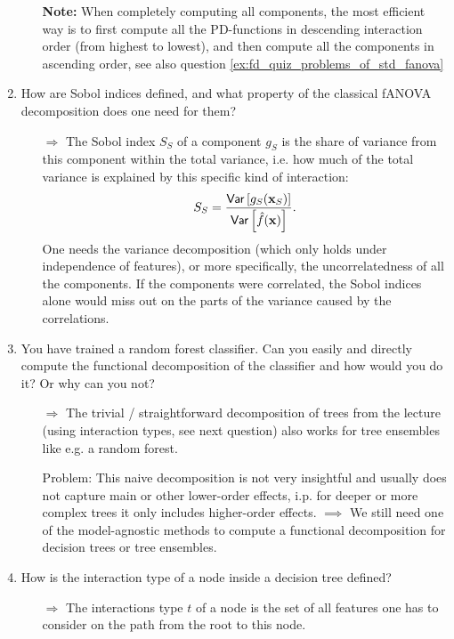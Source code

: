 \begin{enumerate}
\begin{itemize}
        \textbf{Note:} When completely computing all components, the most efficient way is to first compute all the PD-functions in descending interaction order (from highest to lowest), and then compute all the components in ascending order, see also question \ref{ex:fd_quiz_problems_of_std_fanova}
    \end{itemize}
    \item 
    How are Sobol indices defined, and what property of the classical fANOVA decomposition does one need for them?
    \begin{itemize}
        \item[$\Rightarrow$]
        The Sobol index $S_S$ of a component $g_S$ is the share of variance from this component within the total variance, i.e. how much of the total variance is explained by this specific kind of interaction:
        $$
        S_S = \frac{\mathsf{Var}\left[g_S(\mathbf{x}_S)\right]}{\mathsf{Var}\left[\hat{f}(\mathbf{x})\right]}.
        $$
        One needs the variance decomposition (which only holds under independence of features), or more specifically, the uncorrelatedness of all the components.
        If the components were correlated, the Sobol indices alone would miss out on the parts of the variance caused by the correlations.
    \end{itemize}
    \item
    You have trained a random forest classifier. Can you easily and directly compute the functional decomposition of the classifier and how would you do it? Or why can you not?
    \begin{itemize}
        \item[$\Rightarrow$] 
        The trivial / straightforward decomposition of trees from the lecture (using interaction types, see next question) also works for tree ensembles like e.g. a random forest.
        
        Problem: This naive decomposition is not very insightful and usually does not capture main or other lower-order effects, i.p. for deeper or more complex trees it only includes higher-order effects. $\implies$ We still need one of the model-agnostic methods to compute a functional decomposition for decision trees or tree ensembles.
    \end{itemize}
    \item
    How is the interaction type of a node inside a decision tree defined?
    \begin{itemize}
        \item[$\Rightarrow$]
        The interactions type $t$ of a node is the set of all features one has to consider on the path from the root to this node.
        

\end{itemize}
\end{enumerate}
